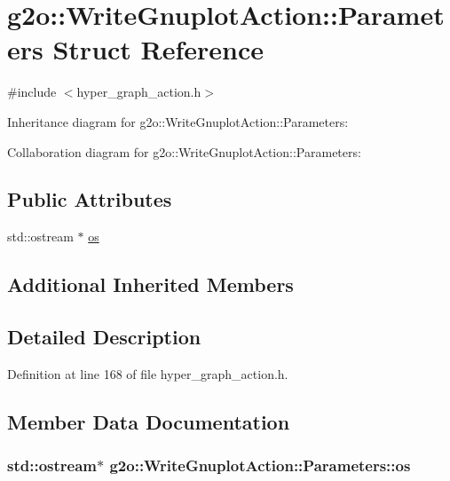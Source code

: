 \hypertarget{structg2o_1_1WriteGnuplotAction_1_1Parameters}{}\section{g2o\+:\+:Write\+Gnuplot\+Action\+:\+:Parameters Struct Reference}
\label{structg2o_1_1WriteGnuplotAction_1_1Parameters}


{\ttfamily \#include $<$hyper\+\_\+graph\+\_\+action.\+h$>$}



Inheritance diagram for g2o\+:\+:Write\+Gnuplot\+Action\+:\+:Parameters\+:


Collaboration diagram for g2o\+:\+:Write\+Gnuplot\+Action\+:\+:Parameters\+:
\subsection*{Public Attributes}
\begin{DoxyCompactItemize}
\item 
std\+::ostream $\ast$ \hyperlink{structg2o_1_1WriteGnuplotAction_1_1Parameters_a8e25b8cffdc008929a939cf9080c5902}{os}
\end{DoxyCompactItemize}
\subsection*{Additional Inherited Members}


\subsection{Detailed Description}


Definition at line 168 of file hyper\+\_\+graph\+\_\+action.\+h.



\subsection{Member Data Documentation}
\subsubsection[{\texorpdfstring{os}{os}}]{\setlength{\rightskip}{0pt plus 5cm}std\+::ostream$\ast$ g2o\+::\+Write\+Gnuplot\+Action\+::\+Parameters\+::os}\hypertarget{structg2o_1_1WriteGnuplotAction_1_1Parameters_a8e25b8cffdc008929a939cf9080c5902}{}\label{structg2o_1_1WriteGnuplotAction_1_1Parameters_a8e25b8cffdc008929a939cf9080c5902}


